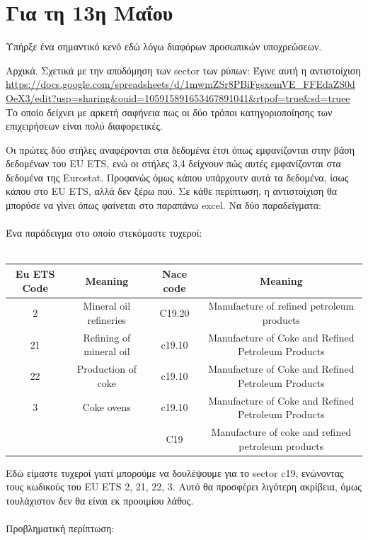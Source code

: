 \documentclass[a4paper,twoside,10pt]{article}
\begin{document}
\newpage


\section{Για τη 13η Μαΐου}
Υπήρξε ένα σημαντικό κενό εδώ λόγω διαφόρων προσωπικών υποχρεώσεων. 

Αρχικά. Σχετικά με την αποδόμηση των sector των ρύπων: Έγινε αυτή η αντιστοίχιση \url{https://docs.google.com/spreadsheets/d/1mwmZSr8PBiFgsxemVE_FFEdaZS0dOeX3/edit?usp=sharing&ouid=105915891653467891041&rtpof=true&sd=truee} Το οποίο δείχνει με αρκετή σαφήνεια πως οι δύο τρόποι κατηγοριοποίησης των επιχειρήσεων είναι πολύ διαφορετικές. 

Οι πρώτες δύο στήλες αναφέρονται στα δεδομένα έτσι όπως εμφανίζονται στην βάση δεδομένων του EU ETS, ενώ οι στήλες 3,4 δείχνουν πώς αυτές εμφανίζονται στα δεδομένα της Eurostat. Προφανώς όμως κάπου υπάρχουτν αυτά τα δεδομένα, ίσως κάπου στο EU ETS, αλλά δεν ξέρω πού. Σε κάθε περίπτωση, η αντιστοίχιση θα μπορύσε να γίνει όπως φαίνεται στο παραπάνω excel. Να δύο παραδείγματα:
\\ \\
Ένα παράδειγμα στο οποίο στεκόμαστε τυχεροί:\\ \\

\begin{tabular}{|c|c|c|c|}
	\hline
	Eu ETS Code & Meaning  & Nace code &  Meaning\\
	\hline
	2 & Mineral oil refineries & C19.20 & Manufacture of refined petroleum products \\
	\hline
	21 & Refining of mineral oil & c19.10 & Manufacture of Coke and Refined Petroleum Products \\
	\hline
	22 & Production of coke & c19.10 & Manufacture of Coke and Refined Petroleum Products \\
	\hline
	3 & Coke ovens & c19.10 & Manufacture of Coke and Refined Petroleum Products \\
	\hline
	&  & C19 & Manufacture of coke and refined petroleum products \\
	\hline
\end{tabular}
Εδώ είμαστε τυχεροί γιατί μπορούμε να δουλέψουμε για το sector c19, ενώνοντας τους κωδικούς του EU ETS 2, 21, 22, 3. Αυτό θα προσφέρει λιγότερη ακρίβεια, όμως τουλάχιστον δεν θα είναι εκ προοιμίου λάθος.
\\ \\
Προβληματική περίπτωση:
\\ \\
\end{document}
